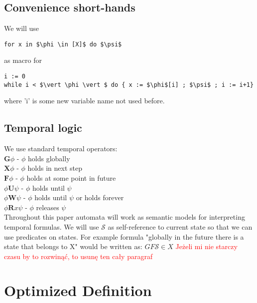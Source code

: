 \documentclass[12pt]{article}
\begin{document}
\subsection{Convenience short-hands}
We will use
\begin{lstlisting}
for x in $\phi \in [X]$ do $\psi$ 
\end{lstlisting}
as macro for 
\begin{lstlisting}
i := 0
while i < $\vert \phi \vert $ do { x := $\phi$[i] ; $\psi$ ; i := i+1}
\end{lstlisting}
where 'i' is some new variable name not used before.
\subsection{Temporal logic}
We use standard temporal operators: \\
$\mathbf{G}\phi$ - $\phi$ holds globally \\
$\mathbf{X}\phi$ - $\phi$ holds in next step \\
$\mathbf{F}\phi$ - $\phi$ holds at some point in future \\
$\phi \mathbf{U}\psi$ - $\phi$ holds until $\psi$ \\
$\phi \mathbf{W}\psi$ - $\phi$ holds until $\psi$ or holds forever \\
$\phi \mathbf{R}x \psi$ - $\phi$ releases $\psi$ \\
Throughout this paper automata will work as semantic models for interpreting temporal formulas. We will use $\mathcal{S}$ as self-reference to current state so that we can use predicates on states. For example formula "globally in the future there is a state that belongs to X" would be written as:
$GF\mathcal{S}\in X$
\textcolor{red}{Jeżeli mi nie starczy czasu by to rozwinąć, to usunę ten cały paragraf}

\section{Optimized Definition}
\end{document}
